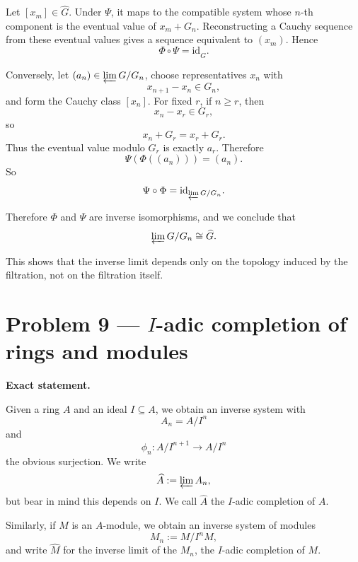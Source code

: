 \documentclass[12pt,a4paper]{article}
\theoremstyle{plain}
\theoremstyle{definition}      %
\begin{document}
Let \([x_m]\in \widehat G\). Under \(\Psi\), it maps to the compatible system whose \(n\)-th component is the eventual value of \(x_m+G_n\). Reconstructing a Cauchy sequence from these eventual values gives a sequence equivalent to \((x_m)\). Hence
\[
\Phi\circ\Psi=\mathrm{id}_{\widehat G}.
\]

Conversely, let \((a_n)\in \varprojlim G/G_n\), choose representatives \(x_n\) with
\[
x_{n+1}-x_n\in G_n,
\]
and form the Cauchy class \([x_n]\). For fixed \(r\), if \(n\ge r\), then
\[
x_n-x_r\in G_r,
\]
so
\[
x_n+G_r=x_r+G_r.
\]
Thus the eventual value modulo \(G_r\) is exactly \(a_r\). Therefore
\[
\Psi(\Phi((a_n)))=(a_n).
\]
So
\[
\Psi\circ\Phi=\mathrm{id}_{\varprojlim G/G_n}.
\]

Therefore \(\Phi\) and \(\Psi\) are inverse isomorphisms, and we conclude that
\[
\varprojlim G/G_n \cong \widehat G.
\]

\medskip
This shows that the inverse limit depends only on the topology induced by the filtration, not on the filtration itself.
	
	
\section*{Problem 9 --- \(I\)-adic completion of rings and modules}

\textbf{Exact statement.}

Given a ring \(A\) and an ideal \(I \subseteq A\), we obtain an inverse system with
\[
A_n = A/I^n
\]
and
\[
\phi_n : A/I^{n+1} \to A/I^n
\]
the obvious surjection. We write
\[
\widehat{A} := \varprojlim A_n,
\]
but bear in mind this depends on \(I\). We call \(\widehat{A}\) the \(I\)-adic completion of \(A\).

Similarly, if \(M\) is an \(A\)-module, we obtain an inverse system of modules
\[
M_n := M/I^nM,
\]
and write \(\widehat{M}\) for the inverse limit of the \(M_n\), the \(I\)-adic completion of \(M\).
\end{document}
